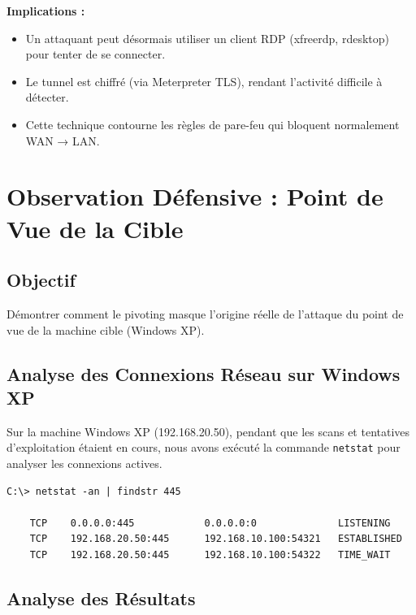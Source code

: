 \documentclass[12pt,a4paper,openany]{report}
\begin{document}
\textbf{Implications :}
\begin{itemize}
	\item Un attaquant peut désormais utiliser un client RDP (xfreerdp, rdesktop) pour tenter de se connecter.
	\item Le tunnel est chiffré (via Meterpreter TLS), rendant l'activité difficile à détecter.
	\item Cette technique contourne les règles de pare-feu qui bloquent normalement WAN → LAN.
\end{itemize}


\section{Observation Défensive : Point de Vue de la Cible}

\subsection{Objectif}

Démontrer comment le pivoting masque l'origine réelle de l'attaque du 
point de vue de la machine cible (Windows XP).

\subsection{Analyse des Connexions Réseau sur Windows XP}

Sur la machine Windows XP (192.168.20.50), pendant que les scans et 
tentatives d'exploitation étaient en cours, nous avons exécuté la 
commande \texttt{netstat} pour analyser les connexions actives.

\begin{lstlisting}[caption=Commande netstat sur Windows XP Client]
	C:\> netstat -an | findstr 445
	
	TCP    0.0.0.0:445            0.0.0.0:0              LISTENING
	TCP    192.168.20.50:445      192.168.10.100:54321   ESTABLISHED
	TCP    192.168.20.50:445      192.168.10.100:54322   TIME_WAIT
\end{lstlisting}

\subsection{Analyse des Résultats}
\end{document}
